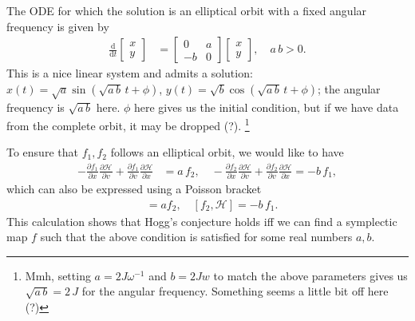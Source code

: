 \documentclass{article}
\newcommand{\dd}{\mathrm{d}}
\begin{document}
The ODE for which the solution is an elliptical orbit with a fixed angular frequency is given by 
\begin{align}
    \frac{\dd}{\dd t} \begin{bmatrix} x \\ y \end{bmatrix} &= \begin{bmatrix} 0 & a \\ -b & 0 \end{bmatrix} \begin{bmatrix} x \\ y \end{bmatrix}, \quad a\,b > 0. 
\end{align}
This is a nice linear system and admits a solution:  $x(t)=\sqrt{a} \sin(\sqrt{a\,b}\,t + \phi) $, $y(t)= \sqrt{b} \cos(\sqrt{a\,b}\,t + \phi)$; the angular frequency is $\sqrt{a\,b}$ here. $\phi$ here gives us the initial condition, but if we have data from the complete orbit, it may be dropped (?). \footnote{Mmh, setting $a = 2 J \omega^{-1}$ and $b = 2 J w$ to match the above parameters gives us $\sqrt{a\,b}=2\,J$ for the angular frequency. Something seems a little bit off here (?)}

To ensure that $f_1, f_2$ follows an elliptical orbit, we would like to have
\begin{align}
    - \frac{\partial f_1}{\partial x} \frac{\partial \mathcal{H}}{\partial v} + \frac{\partial f_1}{\partial v} \frac{\partial \mathcal{H}}{\partial x} &= a\,f_2, \quad
     - \frac{\partial f_2}{\partial x} \frac{\partial \mathcal{H}}{\partial v} + \frac{\partial f_2}{\partial v} \frac{\partial \mathcal{H}}{\partial x} = -b\,f_1,
\end{align}
which can also be expressed using a Poisson bracket 
\begin{align}
    [f_1, \mathcal{H}] &= a f_2, \quad [f_2, \mathcal{H}] = -b\,f_1. 
\end{align}
This calculation shows that Hogg's conjecture holds iff we can find a symplectic map $f$ such that the above condition is satisfied for some real numbers $a, b$. 
\end{document}
